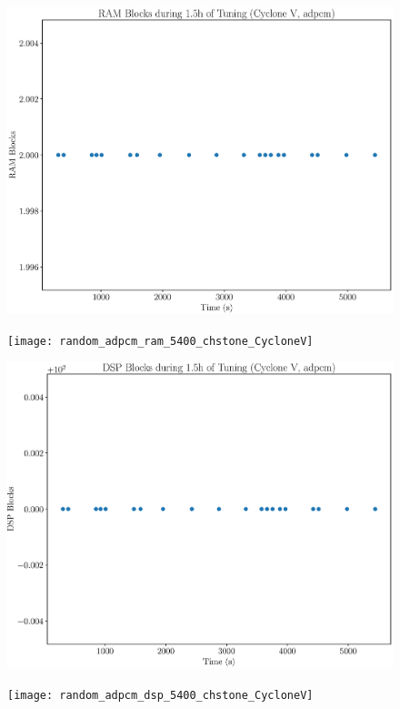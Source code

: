 \documentclass[12pt, a4paper]{article}
\begin{document}
\begin{figure}[htpb]
    \centering
    \noindent
    \begin{minipage}{.48\textwidth}
        \centering
        \includegraphics[scale=.25]{adpcm_ram_5400_chstone_CycloneV}
    \end{minipage}%
    \hfill
    \begin{minipage}{.48\textwidth}
        \centering
        \texttt{[image: random\_adpcm\_ram\_5400\_chstone\_CycloneV]}
    \end{minipage}%

    \begin{minipage}{.48\textwidth}
        \includegraphics[scale=.25]{adpcm_dsp_5400_chstone_CycloneV}
    \end{minipage}%
    \hfill
    \begin{minipage}{.48\textwidth}
        \texttt{[image: random\_adpcm\_dsp\_5400\_chstone\_CycloneV]}
    \end{minipage}%


\end{figure}
\end{document}
